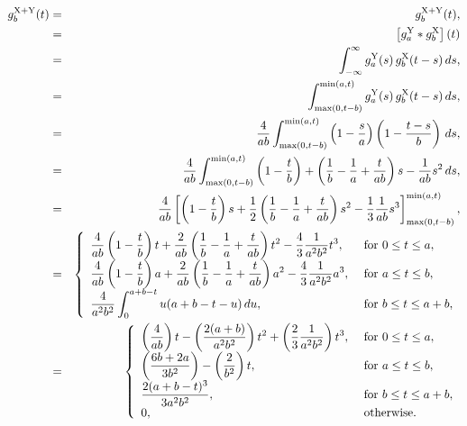 \begin{eqnarray}
    g^{\rm X+Y}_b(t) & = & g^{\rm X+Y}_b(t), \nonumber \\
       & = & \left[ g^{\rm Y}_a *  g^{\rm X}_b \right] (t) \nonumber \\
       & = & \int_{-\infty}^{\infty} g^{\rm Y}_a(s)  \, g^{\rm X}_b(t-s) \, ds,  \nonumber \\
       & = & \int_{\max(0,t-b)}^{\min(a,t)} g^{\rm Y}_a(s)  \, g^{\rm X}_b(t-s) \, ds,  \nonumber \\
       & = & \frac{4}{a b} \int_{\max(0,t-b)}^{\min(a,t)}  
              \left( 1-\frac{s}{a} \right) 
              \left( 1-\frac{t-s}{b} \right)  \, ds,  \nonumber \\
       & = & \frac{4}{a b} \int_{\max(0,t-b)}^{\min(a,t)} 
                   \left( 1 - \frac{t}{b} \right)  
                    + \left( \frac{1}{b} - \frac{1}{a} + \frac{t}{a b} \right)  s  
                    - \frac{1}{a b}  s^2 
                \, ds,  \nonumber \\
       & = & \frac{4}{a b} \left[ \left( 1 - \frac{t}{b} \right) s
              + \frac{1}{2} \left( \frac{1}{b} - \frac{1}{a} + \frac{t}{a b} \right)  s^2 
              - \frac{1}{3} \frac{1}{a b}  s^3
                  \right]_{\max(0,t-b)}^{\min(a,t)},  \nonumber \\
       & = & \left\{ \begin{array}{ll}
           \displaystyle
           \frac{4}{a b} \left( 1 - \frac{t}{b} \right) t
              + \frac{2}{a b} \left( \frac{1}{b} - \frac{1}{a} + \frac{t}{a b} \right)  t^2 
              - \frac{4}{3} \frac{1}{a^2 b^2}  t^3, & \mbox{ for } 0 \leq t \leq a, \\
           \displaystyle
           \frac{4}{a b}  \left( 1 - \frac{t}{b} \right) a
              + \frac{2}{a b} \left( \frac{1}{b} - \frac{1}{a} + \frac{t}{a b} \right)  a^2 
              - \frac{4}{3} \frac{1}{a^2 b^2}  a^3, & \mbox{ for } a \leq t \leq b, \\
           \displaystyle
             \frac{4}{a^2 b^2} \int_{0}^{a+b-t} 
                    u(a+b-t - u) \, du
                , & \mbox{ for } b \leq t \leq a + b , \\
                \end{array} \right. \nonumber \\
       & = & \left\{ \begin{array}{ll}
           \displaystyle
           \left(\frac{4}{a b}\right) t
              - \left(\frac{2(a+b)}{a^2 b^2} \right) t^2
              + \left(\frac{2}{3} \frac{1}{a^2 b^2}\right)  t^3, & \mbox{ for } 0 \leq t \leq a, \\
           \displaystyle
                   \left( \frac{6b + 2a}{3b^2} \right)
              - \left( \frac{2}{b^2}  \right) t, & \mbox{ for } a \leq t \leq b, \\
           \displaystyle
              \frac{2(a+b-t)^3}{3 a^2 b^2}
                     , & \mbox{ for } b \leq t \leq a + b,  \\
           \displaystyle
             0, & \mbox{ otherwise}.
                \end{array} \right. \nonumber \\
  \label{eq:manhattan}
\end{eqnarray}
